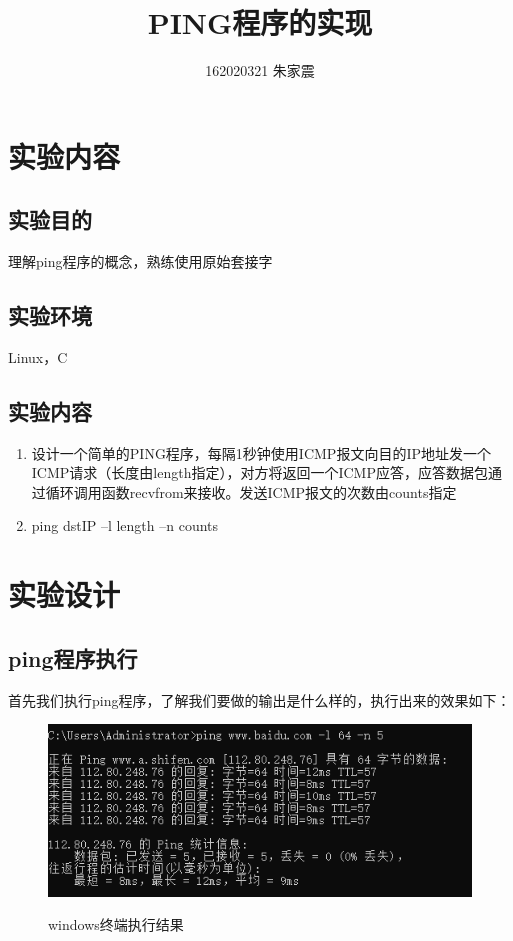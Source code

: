 \documentclass[12pt]{ctexart}
\title{PING程序的实现}
\author{162020321 朱家震}
\begin{document}
    \maketitle
    \setcounter{section}{0}
    \section{实验内容}
    \subsection{实验目的}

    理解ping程序的概念，熟练使用原始套接字

    \subsection{实验环境}

    Linux，C

    \subsection{实验内容}

    \begin{enumerate}
        \item 设计一个简单的PING程序，每隔1秒钟使用ICMP报文向目的IP地址发一个ICMP请求（长度由length指定），对方将返回一个ICMP应答，应答数据包通过循环调用函数recvfrom来接收。发送ICMP报文的次数由counts指定
        \item ping dstIP –l length –n counts
    \end{enumerate}
    
    \section{实验设计}
    \subsection{ping程序执行}

    首先我们执行ping程序，了解我们要做的输出是什么样的，执行出来的效果如下：
    
    \begin{figure}[H]
        \centering
        \includegraphics[width=5in]{figures/win.png}
        \label{sw}
        \caption{windows终端执行结果}
    \end{figure}
\end{document}
